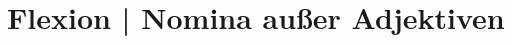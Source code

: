 \documentclass[handout,aspectratio=1610,dvipsnames]{beamer}
\begin{document}
  \section[Nominalflexion]{Flexion | Nomina außer Adjektiven}
  \let\woopsi\section\let\section\subsection\let\subsection\subsubsection
  
  \let\subsection\section\let\section\woopsi
  
\end{document}
